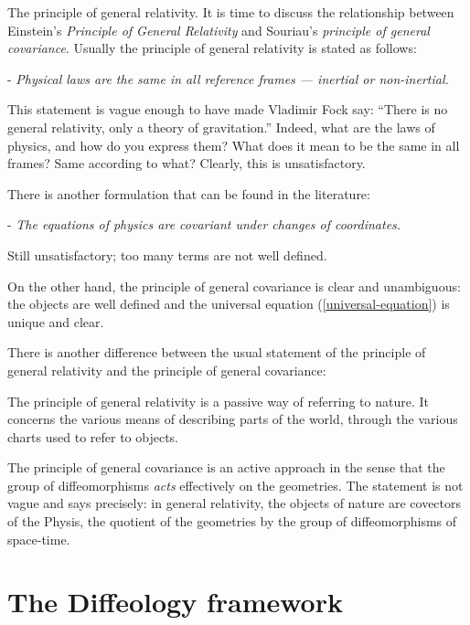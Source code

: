 \begin{Article}{The principle of general relativity.}{}
  It is time to discuss the relationship between Einstein's \emph{Principle of General Relativity} and Souriau's \emph{principle of general covariance}.
  Usually the principle of general relativity is stated as follows:
  
  - {\em Physical laws are the same in all reference frames — inertial or non-inertial.}
  
  This statement is vague enough to have made Vladimir Fock say:
  ``There is no general relativity, only a theory of gravitation.''
  Indeed,
  what are the laws of physics,
  and how do you express them?
  What does it mean to be the same in all frames?
  Same according to what?
  Clearly, this is unsatisfactory.
  
  There is another formulation that can be found in the literature:
  
  - {\em The equations of physics are covariant under changes of coordinates.}
  
  Still unsatisfactory;
  too many terms are not well defined.
  
  On the other hand,
  the principle of general covariance is clear and unambiguous:
  the objects are well defined and the universal equation (\ref{universal-equation}) is unique and clear.
  
  There is another difference between the usual statement of the principle of general relativity and the principle of general covariance:
  
  The principle of general relativity is a passive way of referring to nature.
  It concerns the various means of describing parts of the world,
  through the various charts used to refer to objects.
  
  The principle of general covariance is an active approach in the sense that the group of diffeomorphisms \emph{acts} effectively on the geometries.
  The statement is not vague and says precisely:
  in general relativity,
  the objects of nature are covectors of the Physis,
  the quotient of the geometries by the group of diffeomorphisms of space-time.
\end{Article}

\section{The Diffeology framework}

